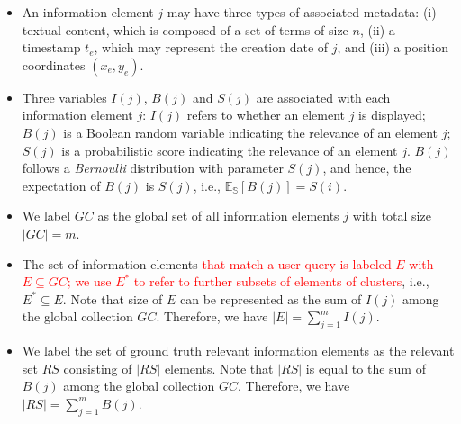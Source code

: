 \begin{itemize}
\item An information element $j$ may have three types of associated metadata: (i) textual content, which is composed of a set of terms of size $n$, (ii) a timestamp $t_e$, which may represent the creation date of $j$, and (iii) a position coordinates $(x_{e},y_{e})$.
\item Three variables $I(j)$, $B(j)$ and $S(j)$ are associated with each information element $j$: $I(j)$ refers to whether an element $j$ is displayed; $B(j)$ is a Boolean random variable indicating the relevance of an element $j$; $S(j)$ is a probabilistic score indicating the relevance of an element $j$. %
$B(j)$ follows a \emph{Bernoulli} distribution with parameter $S(j)$, and hence, the expectation of $B(j)$ is $S(j)$, i.e., 
  $\mathbb{E_S}[B(j)] = S(i)$.
\item We label $GC$ as the global set of all information elements $j$ with total size $|GC|=m$. %
\item The set of information elements \textcolor{red}{that match a user query is labeled $E$ with $E \subseteq  GC$; we use $E^*$ to refer to further subsets of elements of clusters}, i.e., $E^*\subseteq E$. 
Note that size of $E$ can be represented as the sum of $I(j)$ among the global collection $GC$. Therefore, we have $|E| = \sum_{j=1}^m I(j)$.
\item We label the set of ground truth relevant information elements as the relevant set $RS$ consisting of $|RS|$ elements. 
Note that $|RS|$ is equal to the sum of $B(j)$ among the global collection $GC$. Therefore, we have $|RS| = \sum_{j=1}^m B(j)$. %


\end{itemize}
